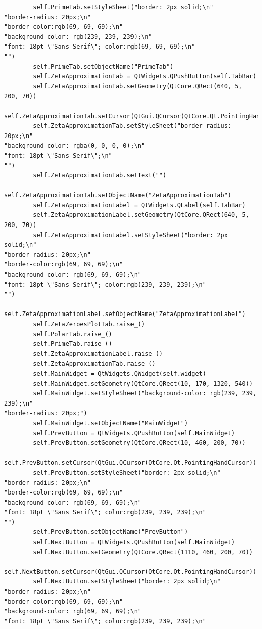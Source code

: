 \documentclass[12pt]{article}
\begin{document}
\begin{lstlisting}
        self.PrimeTab.setStyleSheet("border: 2px solid;\n"
"border-radius: 20px;\n"
"border-color:rgb(69, 69, 69);\n"
"background-color: rgb(239, 239, 239);\n"
"font: 18pt \"Sans Serif\"; color:rgb(69, 69, 69);\n"
"")
        self.PrimeTab.setObjectName("PrimeTab")
        self.ZetaApproximationTab = QtWidgets.QPushButton(self.TabBar)
        self.ZetaApproximationTab.setGeometry(QtCore.QRect(640, 5, 200, 70))
        self.ZetaApproximationTab.setCursor(QtGui.QCursor(QtCore.Qt.PointingHandCursor))
        self.ZetaApproximationTab.setStyleSheet("border-radius: 20px;\n"
"background-color: rgba(0, 0, 0, 0);\n"
"font: 18pt \"Sans Serif\";\n"
"")
        self.ZetaApproximationTab.setText("")
        self.ZetaApproximationTab.setObjectName("ZetaApproximationTab")
        self.ZetaApproximationLabel = QtWidgets.QLabel(self.TabBar)
        self.ZetaApproximationLabel.setGeometry(QtCore.QRect(640, 5, 200, 70))
        self.ZetaApproximationLabel.setStyleSheet("border: 2px solid;\n"
"border-radius: 20px;\n"
"border-color:rgb(69, 69, 69);\n"
"background-color: rgb(69, 69, 69);\n"
"font: 18pt \"Sans Serif\"; color:rgb(239, 239, 239);\n"
"")
        self.ZetaApproximationLabel.setObjectName("ZetaApproximationLabel")
        self.ZetaZeroesPlotTab.raise_()
        self.PolarTab.raise_()
        self.PrimeTab.raise_()
        self.ZetaApproximationLabel.raise_()
        self.ZetaApproximationTab.raise_()
        self.MainWidget = QtWidgets.QWidget(self.widget)
        self.MainWidget.setGeometry(QtCore.QRect(10, 170, 1320, 540))
        self.MainWidget.setStyleSheet("background-color: rgb(239, 239, 239);\n"
"border-radius: 20px;")
        self.MainWidget.setObjectName("MainWidget")
        self.PrevButton = QtWidgets.QPushButton(self.MainWidget)
        self.PrevButton.setGeometry(QtCore.QRect(10, 460, 200, 70))
        self.PrevButton.setCursor(QtGui.QCursor(QtCore.Qt.PointingHandCursor))
        self.PrevButton.setStyleSheet("border: 2px solid;\n"
"border-radius: 20px;\n"
"border-color:rgb(69, 69, 69);\n"
"background-color: rgb(69, 69, 69);\n"
"font: 18pt \"Sans Serif\"; color:rgb(239, 239, 239);\n"
"")
        self.PrevButton.setObjectName("PrevButton")
        self.NextButton = QtWidgets.QPushButton(self.MainWidget)
        self.NextButton.setGeometry(QtCore.QRect(1110, 460, 200, 70))
        self.NextButton.setCursor(QtGui.QCursor(QtCore.Qt.PointingHandCursor))
        self.NextButton.setStyleSheet("border: 2px solid;\n"
"border-radius: 20px;\n"
"border-color:rgb(69, 69, 69);\n"
"background-color: rgb(69, 69, 69);\n"
"font: 18pt \"Sans Serif\"; color:rgb(239, 239, 239);\n"

\end{lstlisting}
\end{document}
